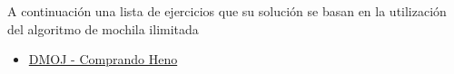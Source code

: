 A continuación una lista de ejercicios que su solución se basan en la utilización del algoritmo de mochila ilimitada

\begin{itemize}
	\item \href{https://dmoj.uclv.edu.cu/problem/buyhay}{DMOJ - Comprando Heno}
\end{itemize}